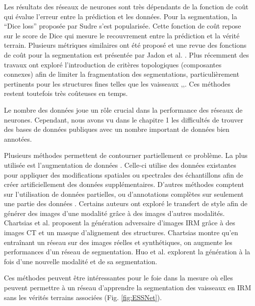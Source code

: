       Les résultats des réseaux de neurones sont très dépendants de la fonction de coût qui évalue l'erreur entre la prédiction et les données. Pour la segmentation, la ``Dice loss'' proposée par Sudre \cite{Sudre2017_DiceLoss} s'est popularisée. Cette fonction de coût repose sur le score de Dice qui mesure le recouvrement entre la prédiction et la vérité terrain. Plusieurs métriques similaires ont été proposé et une revue des fonctions de coût pour la segmentation est présentée par Jadon et al. \cite{Jadon2020_survey_seg_loss}. Plus récemment des travaux ont exploré l'introduction de critères topologiques (composantes connexes) afin de limiter la fragmentation des segmentations, particulièrement pertinents pour les structures fines telles que les vaisseaux \cite{Hu2019_topo_homo_persi},\cite{Clough2019_topo_homo_persi},\cite{Ventura2017iterative_topo}. Ces méthodes restent toutefois très coûteuses en temps. 

      Le nombre des données joue un rôle crucial dans la performance des réseaux de neurones. Cependant, nous avons vu dans le chapitre 1 les difficultés de trouver des bases de données publiques avec un nombre important de données bien annotées. 

      Plusieurs méthodes permettent de contourner partiellement ce problème. La plus utilisée est l'augmentation de données \cite{Liskowski2016_data_augmentation}. Celle-ci utilise des données existantes pour appliquer des modifications spatiales ou spectrales des échantillons afin de créer artificiellement des données supplémentaires. D'autres méthodes comptent sur l'utilisation de données partielles, ou d'annotations complètes sur seulement une partie des données \cite{Tajbakhsh2020_imperfect_datasets}. Certains auteurs ont exploré le transfert de style afin de générer des images d'une modalité grâce à des images d'autres modalités. Chartsias et al. \cite{Chartsias2017_heart_adversarial_im} proposent la génération adversaire d'images IRM grâce à des images CT et un masque d'alignement des structures. Chartsias montre qu'en entraînant un réseau sur des images réelles et synthétiques, on augmente les performances d'un réseau de segmentation. Huo et al. \cite{Huo2018_adversarial} explorent la génération à la fois d'une nouvelle modalité et de sa segmentation.

      Ces méthodes peuvent être intéressantes pour le foie dans la mesure où elles peuvent permettre à un réseau d'apprendre la segmentation des vaisseaux en IRM sans les vérités terrains associées (Fig. \ref{fig:ESSNet}).


